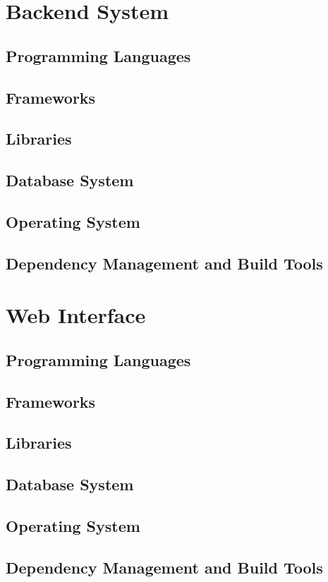 \documentclass[11pt,fleqn]{book} %
\begin{document}
	\section{Backend System}
	\subsection{Programming Languages}
	\subsection{Frameworks}
	\subsection{Libraries}
	\subsection{Database System}
	\subsection{Operating System}
	\subsection{Dependency Management and Build Tools}
	\section{Web Interface}
	\subsection{Programming Languages}
	\subsection{Frameworks}
	\subsection{Libraries}
	\subsection{Database System}
	\subsection{Operating System}
	\subsection{Dependency Management and Build Tools}
\end{document}
